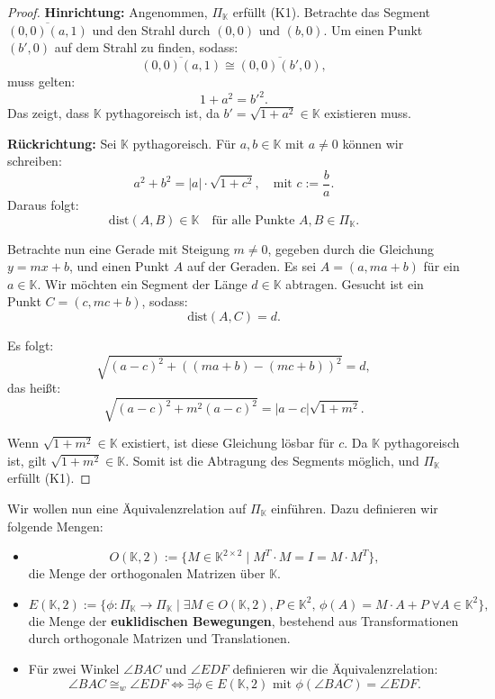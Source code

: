 \documentclass[a4paper,12pt]{article}
\theoremstyle{break}
\begin{document}
\begin{proof}
\textbf{Hinrichtung:}  
Angenommen, \(\Pi_\mathbb{K}\) erfüllt (K1). Betrachte das Segment \(\overline{(0,0)(a,1)}\) und den Strahl durch \((0,0)\) und \((b,0)\).  
Um einen Punkt \((b',0)\) auf dem Strahl zu finden, sodass:
\[
\overline{(0,0)(a,1)} \cong \overline{(0,0)(b',0)},
\]
muss gelten:
\[
1 + a^2 = b'^2.
\]
Das zeigt, dass \(\mathbb{K}\) pythagoreisch ist, da \(b' = \sqrt{1 + a^2} \in \mathbb{K}\) existieren muss.

\textbf{Rückrichtung:}  
Sei \(\mathbb{K}\) pythagoreisch. Für \(a, b \in \mathbb{K}\) mit \(a \neq 0\) können wir schreiben:
\[
a^2 + b^2 = |a| \cdot \sqrt{1 + c^2}, \quad \text{mit } c := \frac{b}{a}.
\]
Daraus folgt:
\[
\text{dist}(A,B) \in \mathbb{K} \quad \text{für alle Punkte } A, B \in \Pi_\mathbb{K}.
\]

Betrachte nun eine Gerade mit Steigung \(m \neq 0\), gegeben durch die Gleichung \(y = mx + b\), und einen Punkt \(A\) auf der Geraden.  
Es sei \(A = (a, ma + b)\) für ein \(a \in \mathbb{K}\). Wir möchten ein Segment der Länge \(d \in \mathbb{K}\) abtragen. Gesucht ist ein Punkt \(C = (c, mc + b)\), sodass:
\[
\text{dist}(A, C) = d.
\]

Es folgt:
\[
\sqrt{(a - c)^2 + ((ma + b) - (mc + b))^2} = d,
\]
das heißt:
\[
\sqrt{(a - c)^2 + m^2(a - c)^2} = |a - c| \sqrt{1 + m^2}.
\]

Wenn \(\sqrt{1 + m^2} \in \mathbb{K}\) existiert, ist diese Gleichung lösbar für \(c\).  
Da \(\mathbb{K}\) pythagoreisch ist, gilt \(\sqrt{1 + m^2} \in \mathbb{K}\). Somit ist die Abtragung des Segments möglich, und \(\Pi_\mathbb{K}\) erfüllt (K1).
\end{proof}

Wir wollen nun eine Äquivalenzrelation auf \(\Pi_\mathbb{K}\) einführen. Dazu definieren wir folgende Mengen:
\begin{itemize}
    \item \[
    O(\mathbb{K}, 2) := \{M \in \mathbb{K}^{2 \times 2} \mid M^T \cdot M = I = M \cdot M^T\},
    \]
    die Menge der orthogonalen Matrizen über \(\mathbb{K}\).
    \item \[
    E(\mathbb{K}, 2) := \{\phi: \Pi_\mathbb{K} \to \Pi_\mathbb{K} \mid \exists M \in O(\mathbb{K}, 2), P \in \mathbb{K}^2, \, \phi(A) = M \cdot A + P \; \forall A \in \mathbb{K}^2\},
    \]
    die Menge der \textbf{euklidischen Bewegungen}, bestehend aus Transformationen durch orthogonale Matrizen und Translationen.
    \item Für zwei Winkel \(\angle BAC\) und \(\angle EDF\) definieren wir die Äquivalenzrelation:
    \[
    \angle BAC \cong_w \angle EDF \iff \exists \phi \in E(\mathbb{K}, 2) \text{ mit } \phi(\angle BAC) = \angle EDF.
    \]
\end{itemize}
\end{document}
